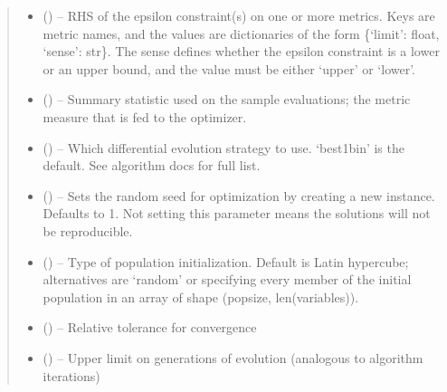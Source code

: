 \documentclass[letterpaper,10pt,english]{sphinxmanual}
\begin{document}
\begin{fulllineitems}
\begin{fulllineitems}
\begin{quote}
\begin{description}
\begin{itemize}
\item {} 
\sphinxAtStartPar
{} () – RHS of the epsilon constraint(s) on one or more metrics. Keys are metric
names, and the values are dictionaries of the form \{‘limit’: float, ‘sense’: str\}.
The sense defines whether the epsilon constraint is a lower or an upper bound,
and the value must be either ‘upper’ or ‘lower’.

\item {} 
\sphinxAtStartPar
{} () – Summary statistic used on the sample evaluations; the metric measure that
is fed to the optimizer.

\item {} 
\sphinxAtStartPar
{} () – Which differential evolution strategy to use. ‘best1bin’ is the default.
See algorithm docs for full list.

\item {} 
\sphinxAtStartPar
{} () – Sets the random seed for optimization by creating a new 
instance. Defaults to 1. Not setting this parameter means the solutions
will not be reproducible.

\item {} 
\sphinxAtStartPar
{} () – Type of population initialization. Default is Latin hypercube;
alternatives are ‘random’ or specifying every member of the initial
population in an array of shape (popsize, len(variables)).

\item {} 
\sphinxAtStartPar
{} () – Relative tolerance for convergence

\item {} 
\sphinxAtStartPar
{} () – Upper limit on generations of evolution (analogous to algorithm
iterations)


\end{itemize}
\end{description}
\end{quote}
\end{fulllineitems}
\end{fulllineitems}
\end{document}
